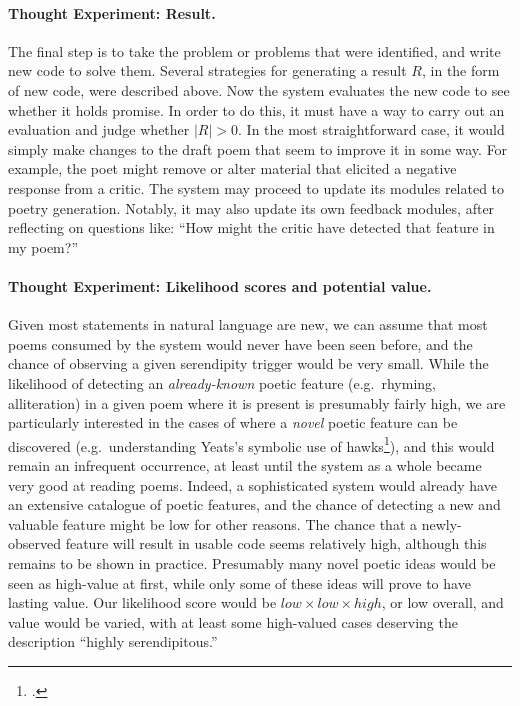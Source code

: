 


\paragraph{Thought Experiment: Result.}

The final step is to take the problem or problems that were
identified, and write new code to solve them.  Several strategies for
generating a result $R$, in the form of new code, were described
above.  Now the system evaluates the new code to see whether it holds
promise.  In order to do this, it must have a way to carry out an
evaluation and judge whether $|R|>0$.  In the most straightforward
case, it would simply make changes to the draft poem that seem to
improve it in some way.  For example, the poet might remove or alter material that
elicited a negative response from a critic.  The system may proceed to
update its modules related to poetry generation.  Notably, it may also update its own
feedback modules, after reflecting on questions like: ``How might the
critic have detected that feature in my poem?''

\paragraph{Thought Experiment: Likelihood scores and potential value.}
Given most statements in natural language are new, we can assume that
most poems consumed by the system would never have been seen before,
and the chance of observing a given serendipity trigger would be very
small.  While the likelihood of detecting an \emph{already-known}
poetic feature (e.g.~rhyming, alliteration) in a given poem where it
is present is presumably fairly high, we are particularly interested
in the cases of where a \emph{novel} poetic feature can be discovered (e.g.~understanding Yeats's symbolic use of hawks\footnote{.}), and this
would remain an infrequent occurrence, at least until the system as a
whole became very good at reading poems.  Indeed, a sophisticated
system would already have an extensive catalogue of poetic features,
and the chance of detecting a new and valuable feature might be low
for other reasons.  The chance that a newly-observed feature will
result in usable code seems relatively high, although this remains to
be shown in practice.  Presumably many novel poetic ideas would be seen as
high-value at first, while only some of these ideas will prove to have
lasting value.  Our likelihood score would be
$\mathit{low}\times\mathit{low}\times\mathit{high}$, or low overall,
and value would be varied, with at least some high-valued cases
deserving the description ``highly serendipitous.''

